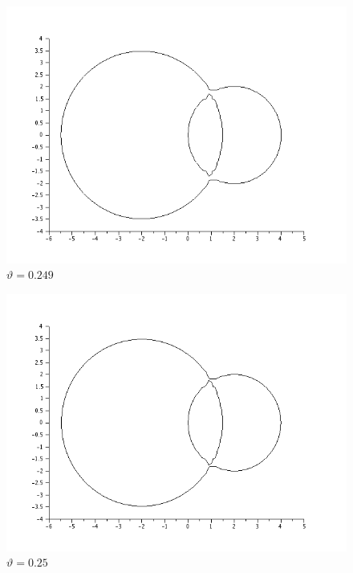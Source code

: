 \documentclass{article}
\begin{document}
\begin{itemize}
\begin{figure}[H]
\includegraphics[width=\textwidth]{img/ej6-5.png}
\caption{$\vartheta = 0.249$ }
\end{figure}

\begin{figure}[H]
\includegraphics[width=\textwidth]{img/ej6-6.png}
\caption{$\vartheta = 0.25$ }
\end{figure}


\end{itemize}
\end{document}

